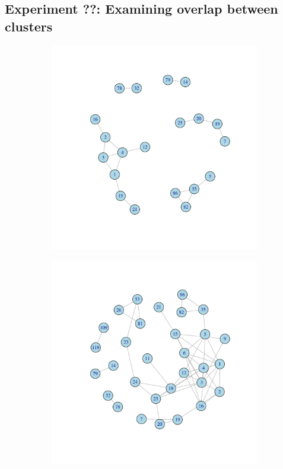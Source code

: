 \documentclass[12pt, oneside]{article}   	%
\begin{document}
\subsection{Experiment ??: Examining overlap between clusters}

\begin{figure}[H]
	\centering
	\begin{subfigure}[t]{0.48\textwidth}
	 \centering
	 \includegraphics[width=\linewidth]{ikc10_m_pw.pdf} 
	 \end{subfigure}
 \hfill
	\begin{subfigure}[t]{0.48\textwidth}
        \centering
        \includegraphics[width=\linewidth]{ikc10_k_pw.pdf} 

\end{subfigure}
\end{figure}
\end{document}
